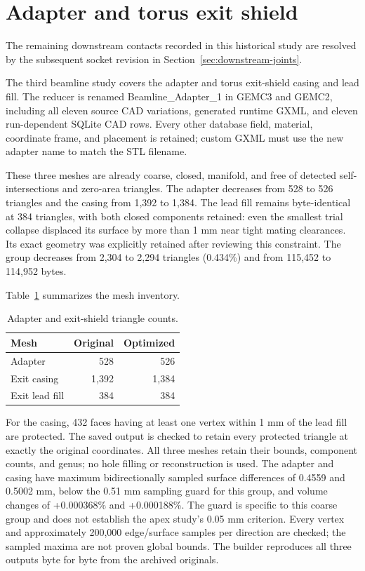 \FloatBarrier
\section{Adapter and torus exit shield}

The remaining downstream contacts recorded in this historical study are resolved by the subsequent socket
revision in Section~\ref{sec:downstream-joints}.

The third beamline study covers the adapter and torus exit-shield casing and lead fill. The reducer is
renamed Beamline\_Adapter\_1 in GEMC3 and GEMC2, including all eleven source CAD variations, generated
runtime GXML, and eleven run-dependent SQLite CAD rows. Every other database field, material, coordinate
frame, and placement is retained; custom GXML must use the new adapter name to match the STL filename.

These three meshes are already coarse, closed, manifold, and free of detected self-intersections and
zero-area triangles. The adapter decreases from 528 to 526 triangles and the casing from 1,392 to 1,384. The
lead fill remains byte-identical at 384 triangles, with both closed components retained: even the smallest
trial collapse displaced its surface by more than 1 mm near tight mating clearances. Its exact geometry was
explicitly retained after reviewing this constraint. The group decreases from 2,304 to 2,294 triangles
(0.434\%) and from 115,452 to 114,952 bytes.

Table~\ref{tab:exit-meshes} summarizes the mesh inventory.

\begin{table}[htbp]
\centering
\caption{Adapter and exit-shield triangle counts.}
\label{tab:exit-meshes}
\begin{tabular}{lrr}
\toprule
Mesh & Original & Optimized \\
\midrule
Adapter & 528 & 526 \\
Exit casing & 1,392 & 1,384 \\
Exit lead fill & 384 & 384 \\
\bottomrule
\end{tabular}
\end{table}

For the casing, 432 faces having at least one vertex within 1 mm of the lead fill are protected. The saved
output is checked to retain every protected triangle at exactly the original coordinates. All three meshes
retain their bounds, component counts, and genus; no hole filling or reconstruction is used. The adapter and
casing have maximum bidirectionally sampled surface differences of 0.4559 and 0.5002 mm, below the 0.51 mm
sampling guard for this group, and volume changes of +0.000368\% and +0.000188\%. The guard is specific to
this coarse group and does not establish the apex study's 0.05 mm criterion. Every vertex and approximately
200,000 edge/surface samples per direction are checked; the sampled maxima are not proven global bounds. The
builder reproduces all three outputs byte for byte from the archived originals.

